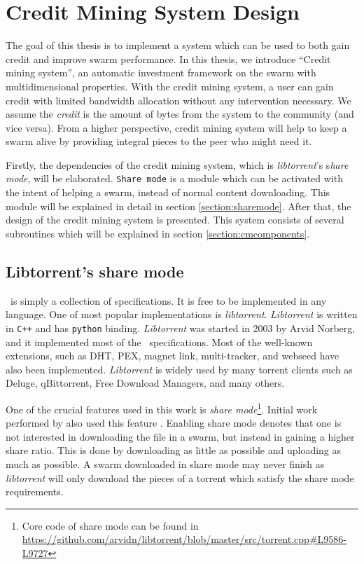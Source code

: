 \chapter{Credit Mining System Design}
\label{chp:design}

The goal of this thesis is to implement a system which can be used to both gain credit and improve swarm performance. In this thesis, we introduce ``Credit mining system'', an automatic investment framework on the swarm with multidimensional properties. With the credit mining system, a user can gain credit with limited bandwidth allocation without any intervention necessary. We assume the \textit{credit} is the amount of bytes from the system to the community (and vice versa). From a higher perspective, credit mining system will help to keep a swarm alive by providing integral pieces to the peer who might need it. 

Firstly, the dependencies of the credit mining system, which is \textit{libtorrent}'s s\textit{hare mode}, will be elaborated. \texttt{Share mode} is a module which can be activated with the intent of helping a swarm, instead of normal content downloading. This module will be explained in detail in section \ref{section:sharemode}. After that, the design of the credit mining system is presented. This system consists of several subroutines which will be explained in section \ref{section:cmcomponents}. 

\section{Libtorrent's share mode}
\label{section:libtorrent}
\label{section:sharemode}
\bt~is simply a collection of specifications. It is free to be implemented in any language. One of most popular implementations is \textit{libtorrent}. \textit{Libtorrent} is written in \texttt{C++} and  has \texttt{python} binding. \textit{Libtorrent} was started in 2003 by Arvid Norberg, and it implemented most of the \bt~specifications. Most of the well-known extensions, such as DHT, PEX, magnet link, multi-tracker, and webseed have also been implemented. \textit{Libtorrent} is widely used by many torrent clients such as Deluge, qBittorrent, Free Download Managers, and many others.

One of the crucial features used in this work is \textit{share mode}\footnote{Core code of share mode can be found in \url{https://github.com/arvidn/libtorrent/blob/master/src/torrent.cpp\#L9586-L9727}}. Initial work performed by \citeauthor{2015:creditmining:capota} also used this feature \cite{2015:creditmining:capota}. Enabling share mode denotes that one is not interested in downloading the file in a swarm, but instead in gaining a higher share ratio. This is done by downloading as little as possible and uploading as much as possible. A swarm downloaded in share mode may never finish as \textit{libtorrent} will only download the pieces of a torrent which satisfy the share mode requirements.

